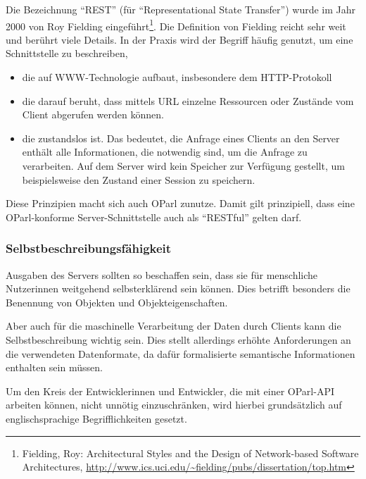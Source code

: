 \documentclass[,a4paper]{article}
\begin{document}
Die Bezeichnung ``REST'' (für ``Representational State Transfer'') wurde
im Jahr 2000 von Roy Fielding eingeführt\footnote{Fielding, Roy:
  Architectural Styles and the Design of Network-based Software
  Architectures,
  \url{http://www.ics.uci.edu/~fielding/pubs/dissertation/top.htm}}. Die
Definition von Fielding reicht sehr weit und berührt viele Details. In
der Praxis wird der Begriff häufig genutzt, um eine Schnittstelle zu
beschreiben,

\begin{itemize}
\itemsep1pt\parskip0pt
\item
  die auf WWW-Technologie aufbaut, insbesondere dem HTTP-Protokoll
\item
  die darauf beruht, dass mittels URL einzelne Ressourcen oder Zustände
  vom Client abgerufen werden können.
\item
  die zustandslos ist. Das bedeutet, die Anfrage eines Clients an den
  Server enthält alle Informationen, die notwendig sind, um die Anfrage
  zu verarbeiten. Auf dem Server wird kein Speicher zur Verfügung
  gestellt, um beispielsweise den Zustand einer Session zu speichern.
\end{itemize}

Diese Prinzipien macht sich auch OParl zunutze. Damit gilt prinzipiell,
dass eine OParl-konforme Server-Schnittstelle auch als ``RESTful''
gelten darf.

\subsubsection{Selbstbeschreibungsfähigkeit}\label{selbstbeschreibungsfuxe4higkeit}

Ausgaben des Servers sollten so beschaffen sein, dass sie für
menschliche Nutzerinnen weitgehend selbsterklärend sein können. Dies
betrifft besonders die Benennung von Objekten und Objekteigenschaften.

Aber auch für die maschinelle Verarbeitung der Daten durch Clients kann
die Selbstbeschreibung wichtig sein. Dies stellt allerdings erhöhte
Anforderungen an die verwendeten Datenformate, da dafür formalisierte
semantische Informationen enthalten sein müssen.

Um den Kreis der Entwicklerinnen und Entwickler, die mit einer OParl-API
arbeiten können, nicht unnötig einzuschränken, wird hierbei
grundsätzlich auf englischsprachige Begrifflichkeiten gesetzt.

\end{document}
